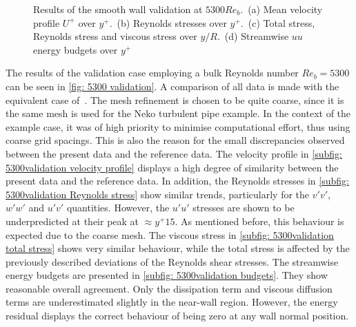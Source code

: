 \begin{figure}
    \centering
    \begin{subfigure}{0.495\textwidth}
        \subcaption{}
        
        \label{subfig: 5300validation velocity profile}
    \end{subfigure}
    \hfill
    \begin{subfigure}{0.495\textwidth}
        \subcaption{}
        
        \label{subfig: 5300validation Reynolds stress}
    \end{subfigure}
    \plotverticalspacing
    \begin{subfigure}{0.495\textwidth}
        \subcaption{}
        
        \label{subfig: 5300validation total stress}
    \end{subfigure}
    \hfill
    \begin{subfigure}{0.495\textwidth}
        \subcaption{}
        
        \label{subfig: 5300validation budgets}
    \end{subfigure}
    \plotverticalspacing
    \caption[Results of the smooth wall validation at $Re_b = 5300$]{Results of the smooth wall validation at $5300 Re_b$.~(a) Mean velocity profile $U^+$ over $y^+$.~(b) Reynolds stresses over $y^+$.~(c) Total stress, Reynolds stress and viscous stress over $y/R$.~(d) Streamwise $uu$ energy budgets over $y^+$}
    \label{fig: 5300 validation}
\end{figure}
The results of the validation case employing a bulk Reynolds number $Re_b = 5300$ can be seen in \autoref{fig: 5300 validation}.
A comparison of all data is made with the equivalent case of~\cite{yaoDirectNumericalSimulations2023}.
The mesh refinement is chosen to be quite coarse, since it is the same mesh is used for the Neko turbulent pipe example.
In the context of the example case, it was of high priority to minimise computational effort, thus using coarse grid spacings.
This is also the reason for the small discrepancies observed between the present data and the reference data.
The velocity profile in \autoref{subfig: 5300validation velocity profile} displays a high degree of similarity between the present data and the reference data.
In addition, the Reynolds stresses in \autoref{subfig: 5300validation Reynolds stress} show similar trends, particularly for the $v'v'$, $w'w'$ and $u'v'$ quantities.
However, the $u'u'$ stresses are shown to be underpredicted at their peak at $\approx y^+ 15$.
As mentioned before, this behaviour is expected due to the coarse mesh.
The viscous stress in \autoref{subfig: 5300validation total stress} shows very similar behaviour, while the total stress is affected by the previously described deviations of the Reynolds shear stresses.
The streamwise energy budgets are presented in \autoref{subfig: 5300validation budgets}.
They show reasonable overall agreement.
Only the dissipation term and viscous diffusion terms are underestimated slightly in the near-wall region.
However, the energy residual displays the correct behaviour of being zero at any wall normal position.

